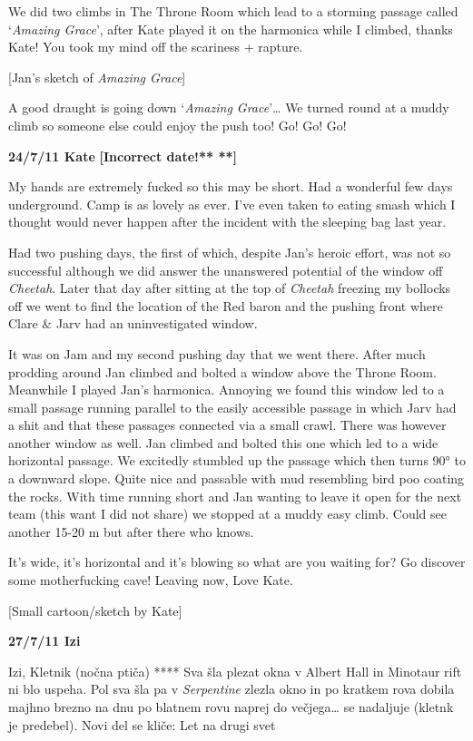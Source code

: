 We did two climbs in The Throne Room which lead to a storming passage
called `\emph{Amazing Grace}', after Kate played it on the harmonica
while I climbed, thanks Kate! You took my mind off the scariness +
rapture.

{[}Jan's sketch of \emph{Amazing Grace}{]}

A good draught is going down `\emph{Amazing Grace}'\ldots{} We turned
round at a muddy climb so someone else could enjoy the push too! Go! Go!
Go!

\textbf{24/7/11 Kate} \textbf{{[}Incorrect date!** **{]}}

My hands are extremely fucked so this may be short. Had a wonderful few
days underground. Camp is as lovely as ever. I've even taken to eating
smash which I thought would never happen after the incident with the
sleeping bag last year.

Had two pushing days, the first of which, despite Jan's heroic effort,
was not so successful although we did answer the unanswered potential of
the window off \emph{Cheetah}. Later that day after sitting at the top
of \emph{Cheetah} freezing my bollocks off we went to find the location
of the Red baron and the pushing front where Clare \& Jarv had an
uninvestigated window.

It was on Jam and my second pushing day that we went there. After much
prodding around Jan climbed and bolted a window above the Throne Room.
Meanwhile I played Jan's harmonica. Annoying we found this window led to
a small passage running parallel to the easily accessible passage in
which Jarv had a shit and that these passages connected via a small
crawl. There was however another window as well. Jan climbed and bolted
this one which led to a wide horizontal passage. We excitedly stumbled
up the passage which then turns 90° to a downward slope. Quite nice and
passable with mud resembling bird poo coating the rocks. With time
running short and Jan wanting to leave it open for the next team (this
want I did not share) we stopped at a muddy easy climb. Could see
another 15-20 m but after there who knows.

It's wide, it's horizontal and it's blowing so what are you waiting for?
Go discover some motherfucking cave! Leaving now, Love Kate.

{[}Small cartoon/sketch by Kate{]}

\textbf{27/7/11 Izi}

Izi, Kletnik (nočna ptiča) **** Sva šla plezat okna v Albert Hall in
Minotaur rift ni blo uspeha. Pol sva šla pa v \emph{Serpentine} zlezla
okno in po kratkem rova dobila majhno brezno na dnu po blatnem rovu
naprej do večjega\ldots{} se nadaljuje (kletnk je predebel). Novi del se
kliče: Let na drugi svet

